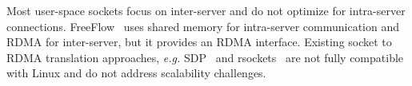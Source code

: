 Most user-space sockets focus on inter-server and do not optimize for intra-server connections.
FreeFlow~\cite{freeflow} uses shared memory for intra-server communication and RDMA for inter-server, but it provides an RDMA interface.
Existing socket to RDMA translation approaches, \textit{e.g.} SDP~\cite{socketsdirect} and rsockets~\cite{rsockets} are not fully compatible with Linux and do not address scalability challenges.


\fi


